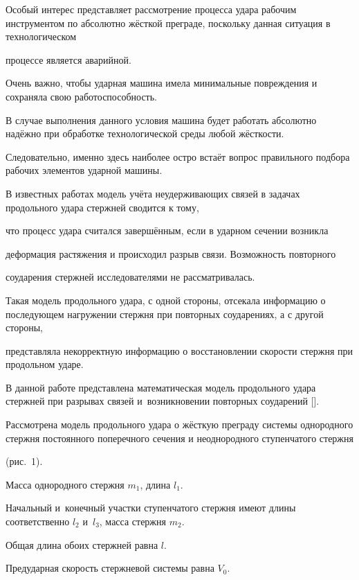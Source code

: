 Особый интерес представляет рассмотрение процесса удара рабочим инструментом по абсолютно жёсткой преграде, поскольку данная ситуация в технологическом

процессе является аварийной. 

Очень важно, чтобы ударная машина имела минимальные повреждения и сохраняла свою работоспособность. 

В случае выполнения данного условия машина будет работать абсолютно надёжно при обработке технологической среды любой жёсткости. 

Следовательно, именно здесь  наиболее остро встаёт вопрос правильного подбора рабочих элементов ударной машины.



\smallskip



 В известных работах модель учёта неудерживающих связей в задачах продольного удара стержней сводится к тому,

что процесс удара считался завершённым, если в ударном сечении возникла

деформация растяжения и происходил разрыв связи. Возможность повторного

соударения стержней исследователями не рассматривалась. 

Такая модель продольного удара, с одной стороны, отсекала информацию о последующем нагружении стержня при повторных соударениях, а с другой стороны,

представляла некорректную информацию о восстановлении скорости стержня при продольном ударе.



В данной работе представлена математическая модель продольного удара стержней при разрывах связей и~возникновении повторных соударений [].



Рассмотрена модель продольного удара о жёсткую преграду системы однородного стержня постоянного поперечного сечения и неоднородного ступенчатого стержня

(рис.~1). 

Масса однородного стержня $m_1$, длина $l_1$. 

Начальный и~конечный участки ступенчатого стержня имеют длины соответственно $l_2$ и~$l_3$, масса стержня $m_2$. 

Общая длина обоих стержней равна $l$.

Предударная скорость стержневой системы равна $V_0$. 

